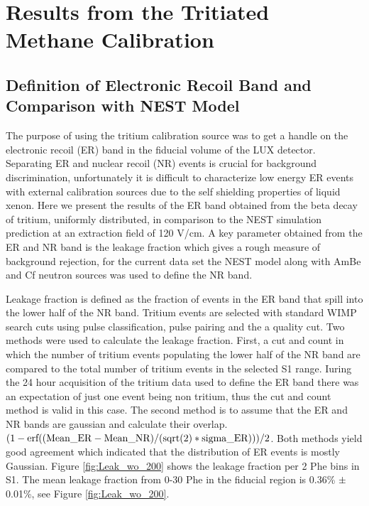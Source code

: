 \section{Results from the Tritiated Methane Calibration}



\subsection{Definition of Electronic Recoil Band and Comparison with NEST Model}

The purpose of using the tritium calibration source was to get a handle on the electronic recoil (ER) band in the fiducial volume of the LUX detector. Separating ER and nuclear recoil (NR) events is crucial for background discrimination, unfortunately it is difficult to characterize low energy ER events with external calibration sources due to the self shielding properties of liquid xenon. Here we present the results of the ER band obtained from the beta decay of tritium, uniformly distributed, in comparison to the NEST simulation prediction at an extraction field of 120 V/cm. A key parameter obtained from the ER and NR band is the leakage fraction which gives a rough measure of background rejection, for the current data set the NEST model along with AmBe and Cf neutron sources was used to define the NR band.

Leakage fraction is defined as the fraction of events in the ER band that spill into the lower half of the NR band. Tritium events are selected with standard WIMP search cuts using pulse classification, pulse pairing and the a quality cut. Two methods were used to calculate the leakage fraction. First, a cut and count in which the number of tritium events populating the lower half of the NR band are compared to the total number of tritium events in the selected S1 range. Iuring the 24 hour acquisition of the tritium data used to define the ER band there was an expectation of just one event being non tritium, thus the cut and count method is valid in this case. The second method is to assume that the ER and NR bands are gaussian and calculate their overlap. $\rm (1-erf((Mean\_ER-Mean\_NR)/(sqrt(2)*sigma\_ER)))/2 $. Both methods yield good agreement which indicated that the distribution of ER events is mostly Gaussian. Figure \ref{fig:Leak_wo_200} shows the leakage fraction per 2 Phe bins in S1. The mean leakage fraction from 0-30 Phe in the fiducial region is 0.36\% $\rm \pm$ 0.01\%, see Figure \ref{fig:Leak_wo_200}.


